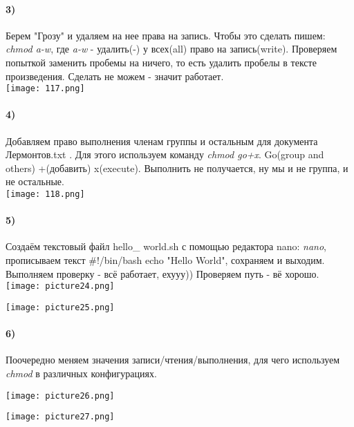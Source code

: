 		\paragraph{3)}
		Берем "Грозу" и удаляем на нее права на запись. Чтобы это сделать пишем: 		\textit{chmod a-w}, где \textit{a-w} - удалить(-) у всех(all) право на 				запись(write). Проверяем попыткой заменить пробемы на ничего, то есть удалить 		пробелы в тексте произведения. Сделать не можем - значит работает.\\
	\texttt{[image: 117.png]}
	\\
	
		\paragraph{4)}
		Добавляем право выполнения членам группы и остальным  для документа 			Лермонтов.txt . Для этого используем команду \textit{chmod go+x}. Go(group and 		others) +(добавить) x(execute). Выполнить не получается, ну мы и не группа, и 		не остальные.\\
	\texttt{[image: 118.png]}
	\\
		\paragraph{5)}
		Создаём текстовый файл hello\_ world.sh с помощью редактора nano: 				\textit{nano}, прописываем текст \#!/bin/bash echo "Hello World", сохраняем и 		выходим. Выполняем проверку - всё работает, ехууу)) Проверяем путь - вё хорошо.		\\
	\texttt{[image: picture24.png]}
	\begin{center}
		\texttt{[image: picture25.png]}
	\end{center}
	
		\paragraph{6)}
		Поочередно меняем значения записи/чтения/выполнения, для чего используем 		\textit{chmod} в различных конфигурациях.\\
		\begin{center}
			\texttt{[image: picture26.png]}
		\end{center}
		\vspace{0.1cm}
		\begin{center}
			\texttt{[image: picture27.png]}
		\end{center}


	  
	  
	  
		